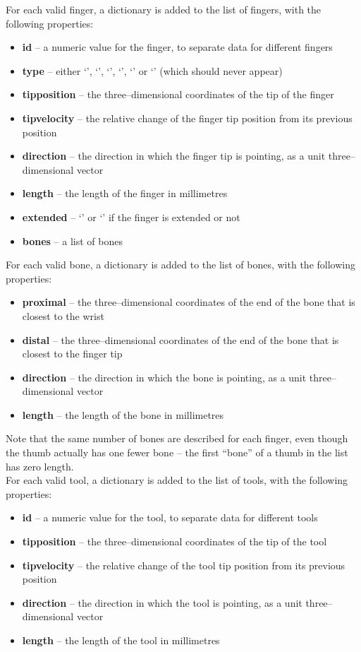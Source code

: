 For each valid finger, a dictionary is added to the list of fingers, with the following
properties:
\begin{itemize}
\item \textbf{id} -- a numeric value for the finger, to separate data for different
fingers
\item \textbf{type} -- either `', `', `',
`', `' or `' (which should never appear)
\item \textbf{tipposition} -- the three--dimensional coordinates of the tip of the finger
\item \textbf{tipvelocity} -- the relative change of the finger tip position from its
previous position
\item \textbf{direction} -- the direction in which the finger tip is pointing, as a unit
three--dimensional vector
\item \textbf{length} -- the length of the finger in millimetres
\item \textbf{extended} -- `' or `' if the finger is extended or
not
\item \textbf{bones} -- a list of bones
\end{itemize}

For each valid bone, a dictionary is added to the list of bones, with the following
properties:
\begin{itemize}
\item \textbf{proximal} -- the three--dimensional coordinates of the end of the bone that
is closest to the wrist
\item \textbf{distal} -- the three--dimensional coordinates of the end of the bone that is
closest to the finger tip
\item \textbf{direction} -- the direction in which the bone is pointing, as a unit
three--dimensional vector
\item \textbf{length} -- the length of the bone in millimetres
\end{itemize}
Note that the same number of bones are described for each finger, even though the thumb
actually has one fewer bone -- the first ``bone'' of a thumb in the list has zero
length.\\

For each valid tool, a dictionary is added to the list of tools, with the following
properties:
\begin{itemize}
\item \textbf{id} -- a numeric value for the tool, to separate data for different tools
\item \textbf{tipposition} -- the three--dimensional coordinates of the tip of the tool
\item \textbf{tipvelocity} -- the relative change of the tool tip position from its
previous position
\item \textbf{direction} -- the direction in which the tool is pointing, as a unit
three--dimensional vector
\item \textbf{length} -- the length of the tool in millimetres
\end{itemize}
\primaryEnd{}
